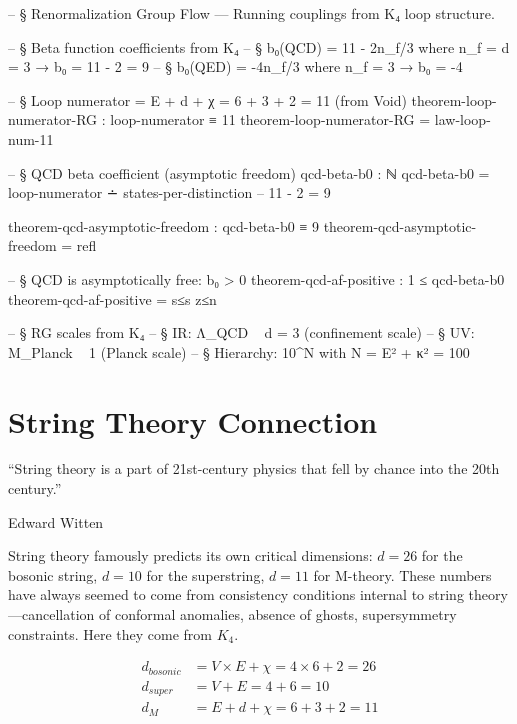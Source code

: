 \documentclass[11pt,a4paper]{book}
\def\text#1{#1}%
\begin{document}
\begin{code}
-- § Renormalization Group Flow — Running couplings from K₄ loop structure.

-- § Beta function coefficients from K₄
-- § b₀(QCD) = 11 - 2n_f/3 where n_f = d = 3 → b₀ = 11 - 2 = 9
-- § b₀(QED) = -4n_f/3 where n_f = 3 → b₀ = -4

-- § Loop numerator = E + d + χ = 6 + 3 + 2 = 11 (from Void)
theorem-loop-numerator-RG : loop-numerator ≡ 11
theorem-loop-numerator-RG = law-loop-num-11

-- § QCD beta coefficient (asymptotic freedom)
qcd-beta-b0 : ℕ
qcd-beta-b0 = loop-numerator ∸ states-per-distinction  -- 11 - 2 = 9

theorem-qcd-asymptotic-freedom : qcd-beta-b0 ≡ 9
theorem-qcd-asymptotic-freedom = refl

-- § QCD is asymptotically free: b₀ > 0
theorem-qcd-af-positive : 1 ≤ qcd-beta-b0
theorem-qcd-af-positive = s≤s z≤n

-- § RG scales from K₄
-- § IR: Λ_QCD ~ d = 3 (confinement scale)
-- § UV: M_Planck ~ 1 (Planck scale)
-- § Hierarchy: 10^N with N = E² + κ² = 100
\end{code}

\chapter{String Theory Connection}
\label{ch:string-theory}

\epigraph{``String theory is a part of 21st-century physics that fell by chance into the 20th century.''}{Edward Witten}

String theory famously predicts its own critical dimensions: $d = 26$ for the bosonic string, $d = 10$ for the superstring, $d = 11$ for M-theory. These numbers have always seemed to come from consistency conditions internal to string theory---cancellation of conformal anomalies, absence of ghosts, supersymmetry constraints. Here they come from $K_4$.

\begin{align}
d_{\text{bosonic}} &= V \times E + \chi = 4 \times 6 + 2 = 26 \\
d_{\text{super}} &= V + E = 4 + 6 = 10 \\
d_{\text{M}} &= E + d + \chi = 6 + 3 + 2 = 11
\end{align}
\end{document}
